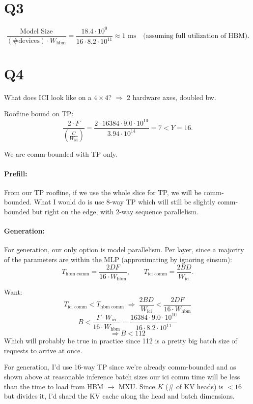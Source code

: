 \documentclass[11pt]{article}
\newcommand{\Wici}{W_{\text{ici}}}
\newcommand{\Whbm}{W_{\text{hbm}}}
\begin{document}
\section*{Q3}

\[
\frac{\text{Model Size}}{(\text{\# devices}) \cdot \Whbm} = \frac{18.4 \cdot 10^9}{16 \cdot 8.2 \cdot 10^{11}} \approx 1 \text{ ms} \quad \text{(assuming full utilization of HBM)}.
\]

\section*{Q4}

What does ICI look like on a $4 \times 4$? $\Rightarrow$ 2 hardware axes, doubled bw.

Roofline bound on TP:
\[
\frac{2 \cdot F}{\left(\frac{C}{\Wici}\right)} = \frac{2 \cdot 16384 \cdot 9.0 \cdot 10^{10}}{3.94 \cdot 10^{14}} = 7 < Y = 16.
\]

We are comm-bounded with TP only.

\paragraph{Prefill:} From our TP roofline, if we use the whole slice for TP, we will be comm-bounded. What I would do is use 8-way TP which will still be slightly comm-bounded but right on the edge, with 2-way sequence parallelism.

\paragraph{Generation:} For generation, our only option is model parallelism. Per layer, since a majority of the parameters are within the MLP (approximating by ignoring einsum):
\[
T_{\text{hbm comm}} = \frac{2DF}{16 \cdot \Whbm}, \qquad T_{\text{ici comm}} = \frac{2BD}{\Wici}.
\]

Want:
\[
T_{\text{ici comm}} < T_{\text{hbm comm}} \;\Rightarrow\; \frac{2BD}{\Wici} < \frac{2DF}{16 \cdot \Whbm}
\]
\[
B < \frac{F \cdot \Wici}{16 \cdot \Whbm} = \frac{16384 \cdot 9.0 \cdot 10^{10}}{16 \cdot 8.2 \cdot 10^{11}}
\]
\[
\Rightarrow B < 112
\]
Which will probably be true in practice since 112 is a pretty big batch size of requests to arrive at once.

For generation, I'd use 16-way TP since we're already comm-bounded and as shown above at reasonable inference batch sizes our ici comm time will be less than the time to load from HBM $\to$ MXU. Since $K$ (\# of KV heads) is $< 16$ but divides it, I'd shard the KV cache along the head and batch dimensions.
\end{document}
